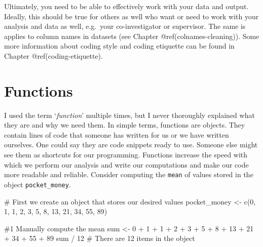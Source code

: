 \documentclass[
  letterpaper,
]{krantz}
\makeatletter
\newenvironment{Shaded}{\begin{snugshade}}{\end{snugshade}}
\newcommand{\CommentTok}[1]{\textcolor[rgb]{0.37,0.37,0.37}{#1}}
\newcommand{\DecValTok}[1]{\textcolor[rgb]{0.68,0.00,0.00}{#1}}
\newcommand{\FunctionTok}[1]{\textcolor[rgb]{0.28,0.35,0.67}{#1}}
\newcommand{\NormalTok}[1]{\textcolor[rgb]{0.00,0.23,0.31}{#1}}
\newcommand{\OtherTok}[1]{\textcolor[rgb]{0.00,0.23,0.31}{#1}}
\newcommand{\SpecialCharTok}[1]{\textcolor[rgb]{0.37,0.37,0.37}{#1}}
\newenvironment{kframe}{%
\medskip{}
\setlength{\fboxsep}{.8em}
 \def\at@end@of@kframe{}%
 \ifinner\ifhmode%
  \def\at@end@of@kframe{\end{minipage}}%
  \begin{minipage}{\columnwidth}%
 \fi\fi%
 \def\FrameCommand##1{\hskip\@totalleftmargin \hskip-\fboxsep
 \colorbox{shadecolor}{##1}\hskip-\fboxsep
     \hskip-\linewidth \hskip-\@totalleftmargin \hskip\columnwidth}%
 \MakeFramed {\advance\hsize-\width
   \@totalleftmargin\z@ \linewidth\hsize
   \@setminipage}}%
 {\par\unskip\endMakeFramed%
 \at@end@of@kframe}
\renewenvironment{Shaded}{\begin{kframe}}{\end{kframe}}
\makeatother
\begin{document}
Ultimately, you need to be able to effectively work with your data and
output. Ideally, this should be true for others as well who want or need
to work with your analysis and data as well, e.g.~your co-investigator
or supervisor. The same is applies to column names in datasets (see
Chapter @ref(colnames-cleaning)). Some more information about coding
style and coding etiquette can be found in Chapter
@ref(coding-etiquette).

\section{Functions}\label{sec-functions}

I used the term `\emph{function}' multiple times, but I never thoroughly
explained what they are and why we need them. In simple terms, functions
are objects. They contain lines of code that someone has written for us
or we have written ourselves. One could say they are code snippets ready
to use. Someone else might see them as shortcuts for our programming.
Functions increase the speed with which we perform our analysis and
write our computations and make our code more readable and reliable.
Consider computing the \texttt{mean} of values stored in the object
\texttt{pocket\_money}.

\begin{Shaded}
\begin{Highlighting}[]
\CommentTok{\# First we create an object that stores our desired values}
\NormalTok{pocket\_money }\OtherTok{\textless{}{-}} \FunctionTok{c}\NormalTok{(}\DecValTok{0}\NormalTok{, }\DecValTok{1}\NormalTok{, }\DecValTok{1}\NormalTok{, }\DecValTok{2}\NormalTok{, }\DecValTok{3}\NormalTok{, }\DecValTok{5}\NormalTok{, }\DecValTok{8}\NormalTok{, }\DecValTok{13}\NormalTok{, }\DecValTok{21}\NormalTok{, }\DecValTok{34}\NormalTok{, }\DecValTok{55}\NormalTok{, }\DecValTok{89}\NormalTok{)}

\CommentTok{\#1 Manually compute the mean}
\NormalTok{sum }\OtherTok{\textless{}{-}} \DecValTok{0} \SpecialCharTok{+} \DecValTok{1} \SpecialCharTok{+} \DecValTok{1} \SpecialCharTok{+} \DecValTok{2} \SpecialCharTok{+} \DecValTok{3} \SpecialCharTok{+} \DecValTok{5} \SpecialCharTok{+} \DecValTok{8} \SpecialCharTok{+} \DecValTok{13} \SpecialCharTok{+} \DecValTok{21} \SpecialCharTok{+} \DecValTok{34} \SpecialCharTok{+} \DecValTok{55} \SpecialCharTok{+} \DecValTok{89}
\NormalTok{sum }\SpecialCharTok{/} \DecValTok{12} \CommentTok{\# There are 12 items in the object}
\end{Highlighting}
\end{Shaded}
\end{document}
